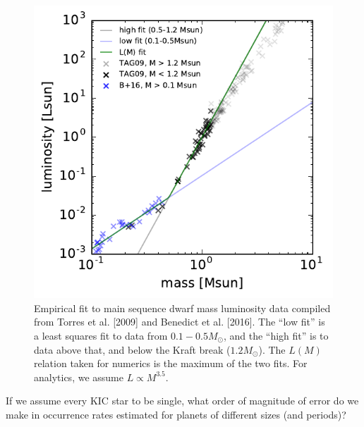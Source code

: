 \documentclass{emulateapj}
\begin{document}
\begin{figure}[!t]
	\begin{center}
		\includegraphics[scale=0.9]{figures/mass_luminosity.pdf}
	\end{center}
	\caption{Empirical fit to main sequence dwarf mass luminosity data compiled 
		from Torres et al. [2009] and Benedict et al. [2016]. The ``low fit'' is a 
		least squares fit to data from $0.1-0.5M_\odot$, and the ``high fit'' is 
		to 
		data above that, and below the Kraft break ($1.2M_\odot$).
		The $L(M)$ relation taken for numerics is the maximum 
		of the two fits. For analytics, we assume $L\propto M^{3.5}$.
	}
	\label{fig:mass_luminosity}
\end{figure}

If we assume every KIC star to be single, what order of magnitude of error do 
we make in occurrence rates estimated for planets of different sizes (and 
periods)?
\end{document}
